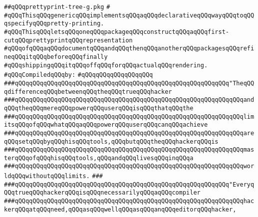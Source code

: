 \label{src/lib/prettyprint/big/src/prettyprint-tree-g.pkg}
\verb|##qQQqprettyprint-tree-g.pkg|\newline
\verb|#|\newline
\verb|#qQQqThisqQQqgenericqQQqimplementsqQQqaqQQqdeclarativeqQQqwayqQQqtoqQQqspecifyqQQqpretty-printing.|\newline
\verb|#qQQqThisqQQqletsqQQqoneqQQqpackageqQQqconstructqQQqaqQQqfirst-cutqQQqprettyprintqQQqrepresentation|\newline
\verb|#qQQqofqQQqaqQQqdocumentqQQqandqQQqthenqQQqanotherqQQqpackagesqQQqrefineqQQqitqQQqbeforeqQQqfinally|\newline
\verb|#qQQqshippingqQQqitqQQqoffqQQqforqQQqactualqQQqrendering.|\newline
\newline
\verb|#qQQqCompiledqQQqby:|\newline
\verb|#qQQqqQQqqQQqqQQqqQQq|\newline
\newline
\newline
\newline
\verb|###qQQqqQQqqQQqqQQqqQQqqQQqqQQqqQQqqQQqqQQqqQQqqQQqqQQqqQQqqQQq"TheqQQqdifferenceqQQqbetweenqQQqtheqQQqtrueqQQqhacker|\newline
\verb|###qQQqqQQqqQQqqQQqqQQqqQQqqQQqqQQqqQQqqQQqqQQqqQQqqQQqqQQqqQQqqQQqandqQQqtheqQQqmereqQQqpowerqQQquserqQQqisqQQqthatqQQqthe|\newline
\verb|###qQQqqQQqqQQqqQQqqQQqqQQqqQQqqQQqqQQqqQQqqQQqqQQqqQQqqQQqqQQqqQQqlimitsqQQqofqQQqwhatqQQqaqQQqpowerqQQquserqQQqcanqQQqachieve|\newline
\verb|###qQQqqQQqqQQqqQQqqQQqqQQqqQQqqQQqqQQqqQQqqQQqqQQqqQQqqQQqqQQqqQQqareqQQqsetqQQqbyqQQqhisqQQqtools,qQQqbutqQQqtheqQQqhackerqQQqis|\newline
\verb|###qQQqqQQqqQQqqQQqqQQqqQQqqQQqqQQqqQQqqQQqqQQqqQQqqQQqqQQqqQQqqQQqmasterqQQqofqQQqhisqQQqtools,qQQqandqQQqlivesqQQqinqQQqa|\newline
\verb|###qQQqqQQqqQQqqQQqqQQqqQQqqQQqqQQqqQQqqQQqqQQqqQQqqQQqqQQqqQQqqQQqworldqQQqwithoutqQQqlimits.|\newline
\verb|###|\newline
\verb|###qQQqqQQqqQQqqQQqqQQqqQQqqQQqqQQqqQQqqQQqqQQqqQQqqQQqqQQqqQQq"EveryqQQqtrueqQQqhackerqQQqisqQQqnecessarilyqQQqaqQQqcompiler|\newline
\verb|###qQQqqQQqqQQqqQQqqQQqqQQqqQQqqQQqqQQqqQQqqQQqqQQqqQQqqQQqqQQqqQQqhackerqQQqatqQQqneed,qQQqasqQQqwellqQQqasqQQqanqQQqeditorqQQqhacker,|\newline
